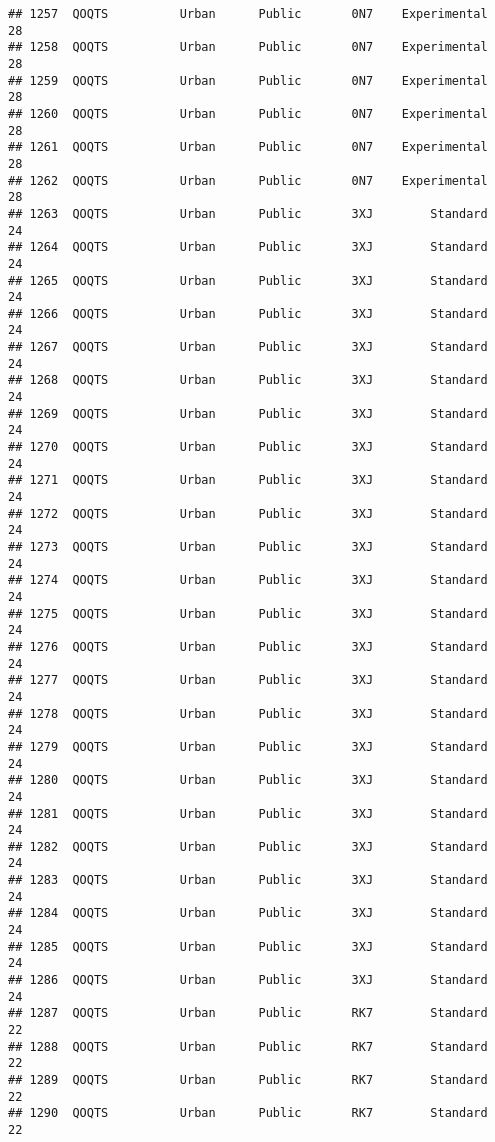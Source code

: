 \documentclass[
]{article}
\begin{document}
\begin{verbatim}
## 1257  QOQTS          Urban      Public       0N7    Experimental        28
## 1258  QOQTS          Urban      Public       0N7    Experimental        28
## 1259  QOQTS          Urban      Public       0N7    Experimental        28
## 1260  QOQTS          Urban      Public       0N7    Experimental        28
## 1261  QOQTS          Urban      Public       0N7    Experimental        28
## 1262  QOQTS          Urban      Public       0N7    Experimental        28
## 1263  QOQTS          Urban      Public       3XJ        Standard        24
## 1264  QOQTS          Urban      Public       3XJ        Standard        24
## 1265  QOQTS          Urban      Public       3XJ        Standard        24
## 1266  QOQTS          Urban      Public       3XJ        Standard        24
## 1267  QOQTS          Urban      Public       3XJ        Standard        24
## 1268  QOQTS          Urban      Public       3XJ        Standard        24
## 1269  QOQTS          Urban      Public       3XJ        Standard        24
## 1270  QOQTS          Urban      Public       3XJ        Standard        24
## 1271  QOQTS          Urban      Public       3XJ        Standard        24
## 1272  QOQTS          Urban      Public       3XJ        Standard        24
## 1273  QOQTS          Urban      Public       3XJ        Standard        24
## 1274  QOQTS          Urban      Public       3XJ        Standard        24
## 1275  QOQTS          Urban      Public       3XJ        Standard        24
## 1276  QOQTS          Urban      Public       3XJ        Standard        24
## 1277  QOQTS          Urban      Public       3XJ        Standard        24
## 1278  QOQTS          Urban      Public       3XJ        Standard        24
## 1279  QOQTS          Urban      Public       3XJ        Standard        24
## 1280  QOQTS          Urban      Public       3XJ        Standard        24
## 1281  QOQTS          Urban      Public       3XJ        Standard        24
## 1282  QOQTS          Urban      Public       3XJ        Standard        24
## 1283  QOQTS          Urban      Public       3XJ        Standard        24
## 1284  QOQTS          Urban      Public       3XJ        Standard        24
## 1285  QOQTS          Urban      Public       3XJ        Standard        24
## 1286  QOQTS          Urban      Public       3XJ        Standard        24
## 1287  QOQTS          Urban      Public       RK7        Standard        22
## 1288  QOQTS          Urban      Public       RK7        Standard        22
## 1289  QOQTS          Urban      Public       RK7        Standard        22
## 1290  QOQTS          Urban      Public       RK7        Standard        22

\end{verbatim}
\end{document}
